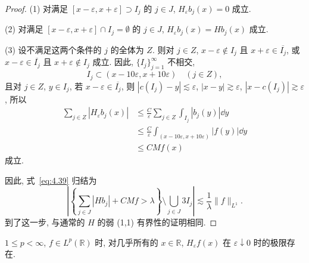 \begin{proof}
(1) 对满足 $[x-\varepsilon, x+\varepsilon] \supset I_{j}$ 的 $j \in J$, $H_{\varepsilon}b_{j}(x) = 0$ 成立.

(2) 对满足 $[x-\varepsilon, x+\varepsilon] \cap I_{j} = \emptyset$ 的 $j \in J$, $H_{\varepsilon}b_{j}(x) = Hb_{j}(x)$ 成立.

(3) 设不满足这两个条件的 $j$ 的全体为 $Z$. 则对 $j \in Z$, $x - \varepsilon \notin I_{j}$ 且 $x + \varepsilon \in \overline{I_{j}}$, 或 $x - \varepsilon \in \overline{I_{j}}$ 且 $x + \varepsilon \notin I_{j}$ 成立. 因此, $\{I_{j}\}_{j=1}^{\infty}$ 不相交,
\[
I_{j} \subset (x-10\varepsilon, x+10\varepsilon) \quad (j \in Z),
\]
且对 $j \in Z$, $y \in I_{j}$, 若 $x - \varepsilon \in \overline{I_{j}}$, 则 $|c(I_{j}) - y| \lesssim \varepsilon$, $|x - y| \gtrsim \varepsilon$, $|x - c(I_{j})| \gtrsim \varepsilon$, 所以
\begin{align*}
\sum_{j \in Z}|H_{\varepsilon}b_{j}(x)| &\leq \frac{C}{\varepsilon}\sum_{j \in Z}\int_{I_{j}}|b_{j}(y)|\dd y \\
&\leq \frac{C}{\varepsilon}\int_{(x-10\varepsilon, x+10\varepsilon)}|f(y)|\dd y \\
&\leq CMf(x)
\end{align*}
成立.

因此, 式~\eqref{eq:4.39} 归结为
\[
\left|\left\{\sum_{j \in J}|Hb_{j}| + CMf > \lambda\right\} \setminus \bigcup_{j \in J}3I_{j}\right| \lesssim \frac{1}{\lambda}\|f\|_{L^{1}}.
\]
到了这一步, 与通常的 $H$ 的弱 (1,1) 有界性的证明相同.
\end{proof}

\begin{theorem}\label{thm:4.9}
$1 \leq p < \infty$, $f \in L^{p}(\mathbb{R})$ 时, 对几乎所有的 $x \in \mathbb{R}$, $H_{\varepsilon}f(x)$ 在 $\varepsilon \downarrow 0$ 时的极限存在.
\end{theorem}

